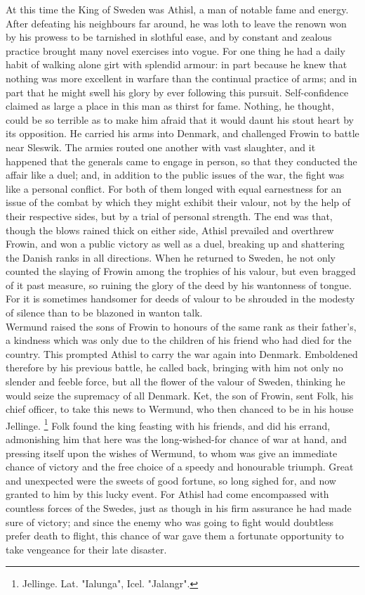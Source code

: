 \documentclass[10pt,a4paper]{report}
\begin{document}
At this time the King of Sweden was Athisl, a man of notable fame and energy. After defeating his neighbours far around, he was loth to leave the renown won by his prowess to be tarnished in slothful ease, and by constant and zealous practice brought many novel exercises into vogue. For one thing he had a daily habit of walking alone girt with splendid armour: in part because he knew that nothing was more excellent in warfare than the continual practice of arms; and in part that he might swell his glory by ever following this pursuit. Self-confidence claimed as large a place in this man as thirst for fame. Nothing, he thought, could be so terrible as to make him afraid that it would daunt his stout heart by its opposition. He carried his arms into Denmark, and challenged Frowin to battle near Sleswik. The armies routed one another with vast slaughter, and it happened that the generals came to engage in person, so that they conducted the affair like a duel; and, in addition to the public issues of the war, the fight was like a personal conflict. For both of them longed with equal earnestness for an issue of the combat by which they might exhibit their valour, not by the help of their respective sides, but by a trial of personal strength. The end was that, though the blows rained thick on either side, Athisl prevailed and overthrew Frowin, and won a public victory as well as a duel, breaking up and shattering the Danish ranks in all directions. When he returned to Sweden, he not only counted the slaying of Frowin among the trophies of his valour, but even bragged of it past measure, so ruining the glory of the deed by his wantonness of tongue. For it is sometimes handsomer for deeds of valour to be shrouded in the modesty of silence than to be blazoned in wanton talk.\\

Wermund raised the sons of Frowin to honours of the same rank as their father's, a kindness which was only due to the children of his friend who had died for the country. This prompted Athisl to carry the war again into Denmark. Emboldened therefore by his previous battle, he called back, bringing with him not only no slender and feeble force, but all the flower of the valour of Sweden, thinking he would seize the supremacy of all Denmark. Ket, the son of Frowin, sent Folk, his chief officer, to take this news to Wermund, who then chanced to be in his house Jellinge. \footnote{Jellinge.  Lat. "Ialunga", Icel. "Jalangr".} Folk found the king feasting with his friends, and did his errand, admonishing him that here was the long-wished-for chance of war at hand, and pressing itself upon the wishes of Wermund, to whom was give an immediate chance of victory and the free choice of a speedy and honourable triumph. Great and unexpected were the sweets of good fortune, so long sighed for, and now granted to him by this lucky event. For Athisl had come encompassed with countless forces of the Swedes, just as though in his firm assurance he had made sure of victory; and since the enemy who was going to fight would doubtless prefer death to flight, this chance of war gave them a fortunate opportunity to take vengeance for their late disaster.\\
\end{document}
